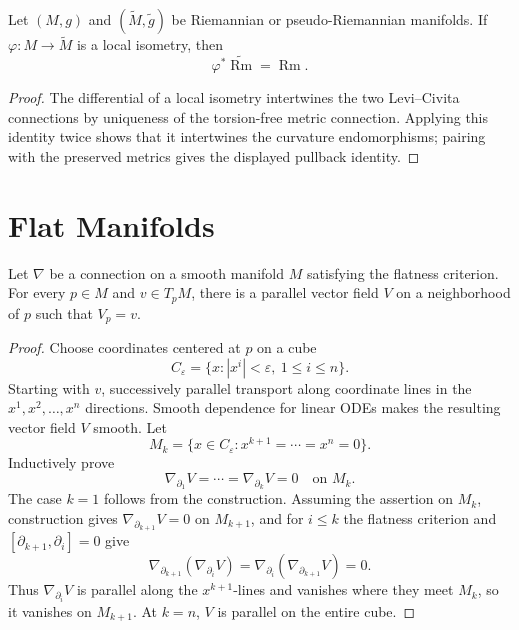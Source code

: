 \begin{proposition}
\label{prop:curvature-isometry-invariant}
Let $(M,g)$ and $(\widetilde M,\widetilde g)$ be Riemannian or
pseudo-Riemannian manifolds. If
$\varphi\colon M\to\widetilde M$ is a local isometry, then
\[
\varphi^*\widetilde{\operatorname{Rm}}=\operatorname{Rm}.
\]
\end{proposition}
\begin{proof}
\sketch
The differential of a local isometry intertwines the two Levi--Civita
connections by uniqueness of the torsion-free metric connection. Applying
this identity twice shows that it intertwines the curvature endomorphisms;
pairing with the preserved metrics gives the displayed pullback identity.
\end{proof}

\section{Flat Manifolds}

\begin{lemma}
\label{lem:parallel-vector-field-flatness}
Let $\nabla$ be a connection on a smooth manifold $M$ satisfying the flatness
criterion. For every $p\in M$ and $v\in T_pM$, there is a parallel vector field
$V$ on a neighborhood of $p$ such that $V_p=v$.
\end{lemma}

\begin{proof}
\sketch Choose coordinates centered at $p$ on a cube
\[
C_\varepsilon=\{x:|x^i|<\varepsilon,\ 1\leq i\leq n\}.
\]
Starting with $v$, successively parallel transport along coordinate lines in
the $x^1,x^2,\ldots,x^n$ directions. Smooth dependence for linear ODEs makes
the resulting vector field $V$ smooth. Let
\[
M_k=\{x\in C_\varepsilon:x^{k+1}=\cdots=x^n=0\}.
\]
Inductively prove
\begin{equation}
\nabla_{\partial_1}V=\cdots=\nabla_{\partial_k}V=0
\quad\text{on }M_k. \tag{7.9}
\end{equation}
The case $k=1$ follows from the construction. Assuming the assertion on
$M_k$, construction gives $\nabla_{\partial_{k+1}}V=0$ on $M_{k+1}$, and for
$i\leq k$ the flatness criterion and
$[\partial_{k+1},\partial_i]=0$ give
\[
\nabla_{\partial_{k+1}}(\nabla_{\partial_i}V)
=\nabla_{\partial_i}(\nabla_{\partial_{k+1}}V)=0.
\]
Thus $\nabla_{\partial_i}V$ is parallel along the $x^{k+1}$-lines and vanishes
where they meet $M_k$, so it vanishes on $M_{k+1}$. At $k=n$, $V$ is parallel
on the entire cube.
\end{proof}

